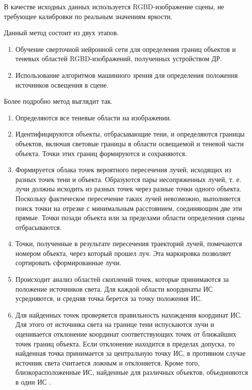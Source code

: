 В качестве исходных данных используется RGBD-изображение сцены, не требующее калибровки по реальным значениям яркости.

Данный метод состоит из двух этапов.
\begin{enumerate}
	\item Обучение сверточной нейронной сети для определения границ объектов и теневых областей RGBD-изображений, полученных устройством ДР.
	\item Использование алгоритмов машинного зрения для определения положения источников освещения в сцене.
\end{enumerate}

Более подробно метод выглядит так.

\begin{enumerate}
	\item Определяются все теневые области на изображении.
	\item Идентифицируются объекты, отбрасывающие тени, и определяются границы объектов, включая световые границы в области освещаемой и теневой части объекта. Точки этих границ формируются и сохраняются.
	\item Формируется облака точек вероятного пересечения лучей, исходящих из разных точек тени и объекта. Образуются пары несопряженных лучей, т. е. лучи должны исходить из разных точек через разные точки одного объекта. Поскольку фактическое пересечение таких лучей невозможно, выполняется поиск точки на отрезке с минимальным расстоянием, соединяющим две эти прямые. Точки позади объекта или за пределами области определения сцены отбрасываются. 
	\item Точки, полученные в результате пересечения траекторий лучей, помечаются номером объекта, через который прошел луч. Эта маркировка позволяет сортировать сформированные лучи.
	\item Происходит анализ областей скоплений точек, которые принимаются за положение источников света. Для каждой области координаты ИС усредняются, и средняя точка берется за точку положения ИС.
	\item Для найденных точек проверяется правильность нахождения координат ИС. Для этого от источника света на границе тени испускаются лучи и оценивается отклонение координат соответствующих точек от ближайших точек границ объекта. Если отклонение находится в пределах допуска, то найденная точка принимается за центральную точку ИС, в противном случае источник света считается ложным и отклоняется. Кроме того, близкорасположенные ИС, найденные для различных объектов, объединяются в один ИС \cite{sns_tras}.
\end{enumerate}

